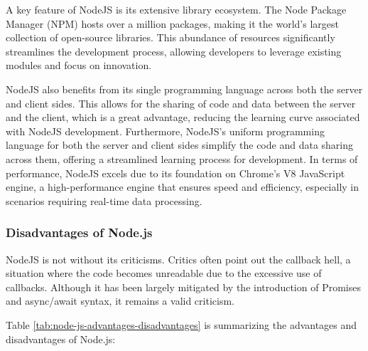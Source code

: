 A key feature of NodeJS is its extensive library ecosystem. The Node Package Manager (NPM) hosts over a million packages, making it the world's largest collection of open-source libraries.\cite{npm} 
This abundance of resources significantly streamlines the development process, allowing developers to leverage existing modules and focus on innovation.

NodeJS also benefits from its single programming language across both the server and client sides. This allows for the sharing of code and data between the server and the client, which is a great advantage, reducing the learning curve associated with NodeJS development. \cite{tilkov}
Furthermore, NodeJS's uniform programming language for both the server and client sides simplify the code and data sharing across them, offering a streamlined learning process for development. In terms of performance, NodeJS excels due to its foundation on Chrome's V8 JavaScript engine, a high-performance engine that ensures speed and efficiency, especially in scenarios requiring real-time data processing. \cite{tilkov}

\subsubsection*{Disadvantages of Node.js}
NodeJS is not without its criticisms. Critics often point out the callback hell, a situation where the code becomes unreadable due to the excessive use of callbacks. Although it has been largely mitigated by the introduction of Promises and async/await syntax, it remains a valid criticism. \cite{cantelon2014node}

Table \ref{tab:node-js-advantages-disadvantages} is summarizing the advantages and disadvantages of Node.js\cite{tilkov}:

